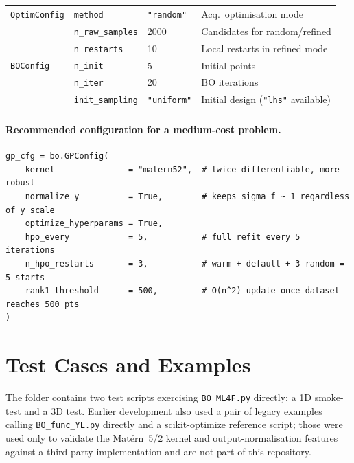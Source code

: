 \documentclass[11pt,a4paper]{article}
\theoremstyle{remark}
\newcommand{\codefile}[1]{\texttt{#1}}
\begin{document}
\begin{table}[ht]
\begin{tabular}{llll}
\midrule
\texttt{OptimConfig} & \texttt{method} & \texttt{"random"}
  & Acq.\ optimisation mode \\
 & \texttt{n\_raw\_samples} & 2000
  & Candidates for random/refined \\
 & \texttt{n\_restarts} & 10
  & Local restarts in refined mode \\
\midrule
\texttt{BOConfig} & \texttt{n\_init} & 5
  & Initial points \\
 & \texttt{n\_iter} & 20
  & BO iterations \\
 & \texttt{init\_sampling} & \texttt{"uniform"}
  & Initial design (\texttt{"lhs"} available) \\
\bottomrule
\end{tabular}
\end{table}

\paragraph{Recommended configuration for a medium-cost problem.}

\begin{lstlisting}[numbers=none]
gp_cfg = bo.GPConfig(
    kernel               = "matern52",  # twice-differentiable, more robust
    normalize_y          = True,        # keeps sigma_f ~ 1 regardless of y scale
    optimize_hyperparams = True,
    hpo_every            = 5,           # full refit every 5 iterations
    n_hpo_restarts       = 3,           # warm + default + 3 random = 5 starts
    rank1_threshold      = 500,         # O(n^2) update once dataset reaches 500 pts
)
\end{lstlisting}

\section{Test Cases and Examples}
\label{sec:examples}

The folder contains two test scripts exercising \codefile{BO\_ML4F.py}
directly: a 1D smoke-test and a 3D test. Earlier development also used a
pair of legacy examples calling \codefile{BO\_func\_YL.py} directly and a
scikit-optimize reference script; those were used only to validate the
Mat\'{e}rn~5/2 kernel and output-normalisation features against a
third-party implementation and are not part of this repository.

\end{document}
